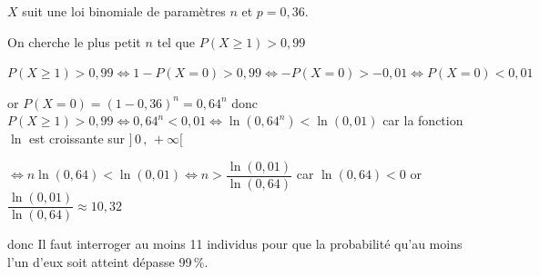 \documentclass[10pt]{article}
\begin{document}
$X$ suit une loi binomiale de paramètres $n$ et $p=0,36$.

 On cherche le plus petit $n$ tel que $P(X \geqslant 1) > 0,99$


$P(X \geq 1) > 0,99 \iff 1 - P(X = 0) > 0,99 \iff -P(X = 0) >- 0,01 \iff P(X = 0) < 0,01$

or  $P(X = 0) = (1 - 0,36)^n = 0,64^n$ donc  $P(X \geq 1) > 0,99 \iff 0,64^n < 0,01\iff  \ln(0,64^n) < \ln(0,01)$ car la fonction $\ln$ est croissante sur $]\,0\,,\,+\infty[$

$\iff  n \ln(0,64) < \ln(0,01) \iff n > \dfrac{\ln(0,01)}{\ln(0,64)} $ car $\ln(0,64)<0$ or $\dfrac{\ln(0,01)}{\ln(0,64)}\approx 10,32$

donc Il faut interroger au moins 11 individus pour que la probabilité qu'au moins l’un d’eux soit atteint dépasse 99\,\%.

\bigskip
\end{document}
